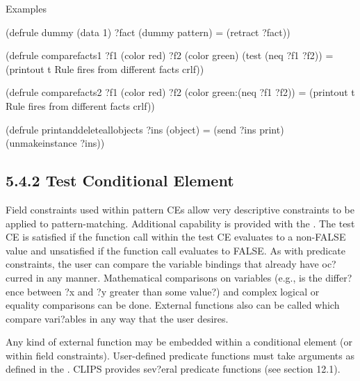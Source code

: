 \documentclass[letterpaper,10pt,english]{sphinxmanual}
\begin{document}
Examples

\begin{sphinxVerbatim}[commandchars=\\\{\}]
(defrule dummy
  (data 1)
  ?fact \PYGZlt{}\PYGZhy{} (dummy pattern)
 =\PYGZgt{}
  (retract ?fact))

(defrule compare\PYGZhy{}facts\PYGZhy{}1
  ?f1 \PYGZlt{}\PYGZhy{} (color \PYGZti{}red)
  ?f2 \PYGZlt{}\PYGZhy{} (color \PYGZti{}green)
  (test (neq ?f1 ?f2))
 =\PYGZgt{}
  (printout t \PYGZdq{}Rule fires from different facts\PYGZdq{} crlf))

(defrule compare\PYGZhy{}facts\PYGZhy{}2
  ?f1 \PYGZlt{}\PYGZhy{} (color \PYGZti{}red)
  ?f2 \PYGZlt{}\PYGZhy{} (color \PYGZti{}green\PYGZam{}:(neq ?f1 ?f2))
 =\PYGZgt{}
  (printout t \PYGZdq{}Rule fires from different facts\PYGZdq{} crlf))

(defrule print\PYGZhy{}and\PYGZhy{}delete\PYGZhy{}all\PYGZhy{}objects
  ?ins \PYGZlt{}\PYGZhy{} (object)
 =\PYGZgt{}
  (send ?ins print)
  (unmake\PYGZhy{}instance ?ins))
\end{sphinxVerbatim}


\subsection{5.4.2 Test Conditional Element}
\label{\detokenize{defrule:test-conditional-element}}
Field constraints used within pattern CEs allow very descriptive
constraints to be applied to pattern-matching. Additional capability is
provided with the  . The test CE is
satisfied if the function call within the test CE evaluates to a
non-FALSE value and unsatisfied if the function call evaluates to FALSE.
As with predicate constraints, the user can compare the variable
bindings that already have oc?curred in any manner. Mathematical
comparisons on variables (e.g., is the differ?ence between ?x and ?y
greater than some value?) and complex logical or equality comparisons
can be done. External functions also can be called which compare
vari?ables in any way that the user desires.

Any kind of external function may be embedded within a 
conditional element (or within field constraints). User-defined
predicate functions must take arguments as defined in the . CLIPS provides sev?eral predicate functions (see
section 12.1).

\end{document}

